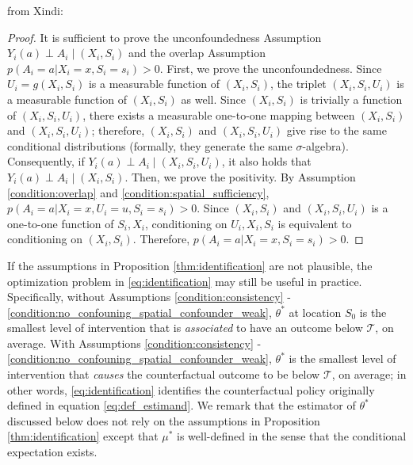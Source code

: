 \documentclass[12pt]{article}
\newcommand{\CP}[1]{{\color{purple}From Chan: #1}}
\newcommand{\XL}[1]{{\color{blue}from Xindi: #1}}
\begin{document}
\XL{
\begin{proof}
It is sufficient to prove the unconfoundedness Assumption $Y_i(a) \perp A_i \mid (X_i, S_i)$ and the overlap Assumption $p(A_i=a|X_i=x,S_i=s_i)>0$. First, we prove the unconfoundedness. Since $U_i = g(X_i, S_i)$ is a measurable function of $(X_i, S_i)$, the triplet $(X_i, S_i, U_i)$ is a measurable function of $(X_i, S_i)$ as well. Since $(X_i, S_i)$ is trivially a function of $(X_i, S_i, U_i)$, there exists a measurable one-to-one mapping between $(X_i, S_i)$ and $(X_i, S_i, U_i)$; therefore, $(X_i, S_i)$ and $(X_i, S_i, U_i)$ give rise to the same conditional distributions (formally, they generate the same $\sigma$-algebra). Consequently, if $Y_i(a) \perp A_i \mid (X_i, S_i, U_i)$, it also holds that $Y_i(a) \perp A_i \mid (X_i, S_i)$. Then, we prove the positivity. By Assumption \ref{condition:overlap} and \ref{condition:spatial_sufficiency}, $p(A_i=a|X_i=x,U_i=u,S_i=s_i)>0$. Since $(X_i, S_i)$ and $(X_i, S_i, U_i)$ is a one-to-one function of $S_i,X_i$, conditioning on $U_i,X_i,S_i$ is equivalent to conditioning on $(X_i, S_i)$. Therefore, $p(A_i=a|X_i=x,S_i=s_i)>0$. 
\end{proof}}
\noindent If the assumptions in Proposition \ref{thm:identification} are not plausible, the optimization problem in \eqref{eq:identification} may still be useful in practice. Specifically, without Assumptions \ref{condition:consistency} - \ref{condition:no_confouning_spatial_confounder_weak},  $\theta^*$ at location $S_0$ is the smallest level of intervention that is \emph{associated} to have an outcome below $\mathcal{T}$, on average. With Assumptions \ref{condition:consistency} - \ref{condition:no_confouning_spatial_confounder_weak}, $\theta^*$ is the smallest level of intervention that \emph{causes} the counterfactual outcome to be below $\mathcal{T}$, on average; in other words,  \eqref{eq:identification} identifies the 
counterfactual policy originally defined in equation \eqref{eq:def_estimand}.  We remark that the estimator of $\theta^*$ discussed below does not rely on the assumptions in Proposition \ref{thm:identification} except that $\mu^*$ is well-defined in the sense that the conditional expectation exists. 

\end{document}
